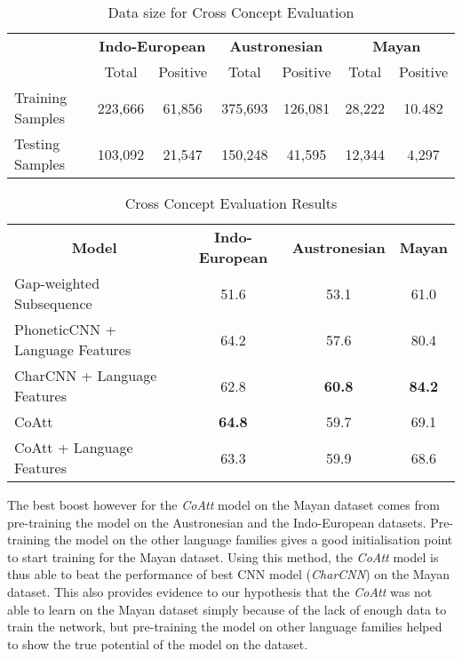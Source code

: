\documentclass[11pt,letterpaper]{article}
\begin{document}
\begin{table*}[t]
\centering
\begin{tabular}{lcccccc}
\multicolumn{1}{c}{\textbf{}} & \multicolumn{2}{c}{\textbf{Indo-European}} & \multicolumn{2}{c}{\textbf{Austronesian}} & \multicolumn{2}{c}{\textbf{Mayan}} \\
\multicolumn{1}{c}{}          & Total               & Positive             & Total               & Positive            & Total           & Positive         \\
Training Samples              & 223,666             & 61,856               & 375,693             & 126,081             & 28,222          & 10.482           \\
Testing Samples               & 103,092             & 21,547               & 150,248             & 41,595              & 12,344          & 4,297           
\end{tabular}
\caption{Data size for Cross Concept Evaluation}
\label{CC_count}
\end{table*}

\begin{table*}[t]
\centering
\begin{tabular}{lccc}
\multicolumn{1}{c}{\textbf{Model}} & \textbf{Indo-European} & \textbf{Austronesian} & \textbf{Mayan} \\
Gap-weighted Subsequence           & 51.6                   & 53.1                  & 61.0           \\
PhoneticCNN + Language Features                 & 64.2                   & 57.6                  & 80.4           \\
CharCNN + Language Features                     & 62.8                   & \textbf{60.8}                  & \textbf{84.2}           \\ \hline
CoAtt                              & \textbf{64.8}                   & 59.7                  & 69.1           \\
CoAtt + Language Features                       & 63.3                   & 59.9                  & 68.6          
\end{tabular}
\label{CC_res}
\caption{Cross Concept Evaluation Results}
\end{table*}

The best boost however for the \textit{CoAtt} model on the Mayan dataset comes from pre-training the model on the Austronesian and the Indo-European datasets. Pre-training the model on the other language families gives a good initialisation point to start training for the Mayan dataset. Using this method, the \textit{CoAtt} model is thus able to beat the performance of best CNN model (\textit{CharCNN}) on the Mayan dataset. This also provides evidence to our hypothesis that the \textit{CoAtt} was not able to learn on the Mayan dataset simply because of the lack of enough data to train the network, but pre-training the model on other language families helped to show the true potential of the model on the dataset.
\end{document}
